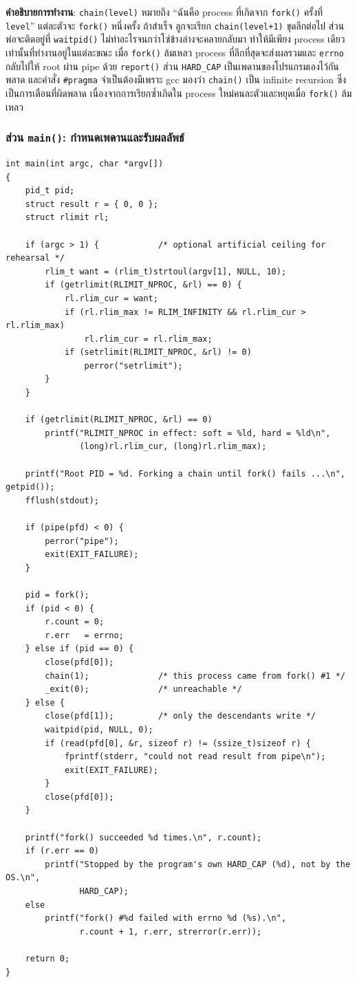 \documentclass[a4paper,12pt]{article}
\newcommand{\code}[1]{\texttt{#1}}
\begin{document}
\textbf{คำอธิบายการทำงาน}: \code{chain(level)} หมายถึง ``ฉันคือ process ที่เกิดจาก \code{fork()} ครั้งที่ \code{level}'' แต่ละตัวจะ \code{fork()} หนึ่งครั้ง ถ้าสำเร็จ ลูกจะเรียก \code{chain(level+1)} ขุดลึกต่อไป ส่วนพ่อจะติดอยู่ที่ \code{waitpid()} ไม่ทำอะไรจนกว่าโซ่ข้างล่างจะคลายกลับมา ทำให้มีเพียง process เดียวเท่านั้นที่ทำงานอยู่ในแต่ละขณะ เมื่อ \code{fork()} ล้มเหลว process ที่ลึกที่สุดจะส่งผลรวมและ \code{errno} กลับไปให้ root ผ่าน pipe ด้วย \code{report()} ส่วน \code{HARD\_CAP} เป็นเพดานของโปรแกรมเองไว้กันพลาด และคำสั่ง \code{\#pragma} จำเป็นต้องมีเพราะ gcc มองว่า \code{chain()} เป็น infinite recursion ซึ่งเป็นการเตือนที่ผิดพลาด เนื่องจากการเรียกซ้ำเกิดใน process ใหม่คนละตัวและหยุดเมื่อ \code{fork()} ล้มเหลว

\newpage

\subsubsection{ส่วน \code{main()}: กำหนดเพดานและรับผลลัพธ์}

\begin{lstlisting}[caption={q3\_forkcount.c -- main(): optional ceiling and result collection},label={lst:q3b}]
int main(int argc, char *argv[])
{
    pid_t pid;
    struct result r = { 0, 0 };
    struct rlimit rl;

    if (argc > 1) {            /* optional artificial ceiling for rehearsal */
        rlim_t want = (rlim_t)strtoul(argv[1], NULL, 10);
        if (getrlimit(RLIMIT_NPROC, &rl) == 0) {
            rl.rlim_cur = want;
            if (rl.rlim_max != RLIM_INFINITY && rl.rlim_cur > rl.rlim_max)
                rl.rlim_cur = rl.rlim_max;
            if (setrlimit(RLIMIT_NPROC, &rl) != 0)
                perror("setrlimit");
        }
    }

    if (getrlimit(RLIMIT_NPROC, &rl) == 0)
        printf("RLIMIT_NPROC in effect: soft = %ld, hard = %ld\n",
               (long)rl.rlim_cur, (long)rl.rlim_max);

    printf("Root PID = %d. Forking a chain until fork() fails ...\n", getpid());
    fflush(stdout);

    if (pipe(pfd) < 0) {
        perror("pipe");
        exit(EXIT_FAILURE);
    }

    pid = fork();
    if (pid < 0) {
        r.count = 0;
        r.err   = errno;
    } else if (pid == 0) {
        close(pfd[0]);
        chain(1);              /* this process came from fork() #1 */
        _exit(0);              /* unreachable */
    } else {
        close(pfd[1]);         /* only the descendants write */
        waitpid(pid, NULL, 0);
        if (read(pfd[0], &r, sizeof r) != (ssize_t)sizeof r) {
            fprintf(stderr, "could not read result from pipe\n");
            exit(EXIT_FAILURE);
        }
        close(pfd[0]);
    }

    printf("fork() succeeded %d times.\n", r.count);
    if (r.err == 0)
        printf("Stopped by the program's own HARD_CAP (%d), not by the OS.\n",
               HARD_CAP);
    else
        printf("fork() #%d failed with errno %d (%s).\n",
               r.count + 1, r.err, strerror(r.err));

    return 0;
}
\end{lstlisting}
\end{document}
